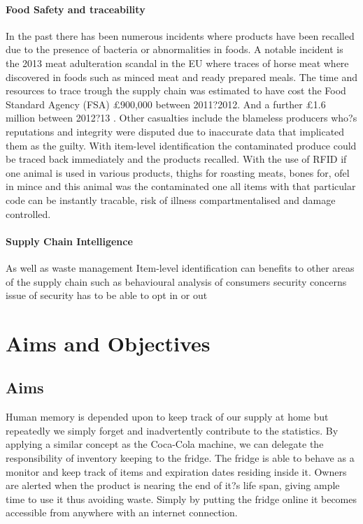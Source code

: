 \documentclass[a4paper, 11pt]{article}
\begin{document}
\paragraph{Food Safety and traceability}
In the past there has been numerous incidents where products have been recalled due to the presence of bacteria or abnormalities in foods. A notable incident is the 2013 meat adulteration scandal in the EU where traces of horse meat where discovered in foods such as minced meat and ready prepared meals. The time and resources to trace trough the supply chain was estimated to have cost the Food Standard Agency (FSA) \pounds900,000 between 2011?2012. And a further \pounds1.6 million between 2012?13 \cite{3}. Other casualties include the blameless producers who?s reputations and integrity were disputed due to inaccurate data that implicated them as the guilty. With item-level identification the contaminated produce could be traced back immediately and the products recalled. With the use of RFID if one animal is used in various products, thighs for roasting meats, bones for, ofel in mince and this animal was the contaminated one all items with that particular code can be instantly tracable, risk of illness compartmentalised and damage controlled. 

\paragraph{Supply Chain Intelligence} As well as waste management Item-level identification can benefits to other areas of the supply chain such as behavioural analysis of consumers
security concerns 
issue of security has to be able to opt in or out


\clearpage
\section{Aims and Objectives}
\subsection{Aims}
Human memory is depended upon to keep track of our supply at home but repeatedly we simply forget and inadvertently contribute to the statistics. By applying a similar concept as the Coca-Cola machine, we can delegate the responsibility of inventory keeping to the fridge. The fridge is able to behave as a monitor and keep track of items and expiration dates residing inside it. Owners are alerted when the product is nearing the end of it?s life span, giving ample time to use it thus avoiding waste. Simply by putting the fridge online it becomes accessible from anywhere with an internet connection.
\end{document}
